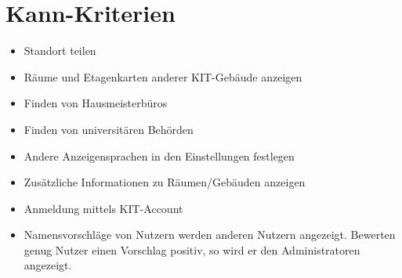 \section{Kann-Kriterien}

\begin{itemize}

    \item Standort teilen 
    \item Räume und Etagenkarten anderer KIT-Gebäude anzeigen
    \item Finden von Hausmeisterbüros
    \item Finden von universitären Behörden
    \item Andere Anzeigensprachen in den Einstellungen festlegen
    \item Zusätzliche Informationen zu Räumen/Gebäuden anzeigen
    \item Anmeldung mittels KIT-Account
    \item Namensvorschläge von Nutzern werden anderen Nutzern angezeigt. Bewerten genug Nutzer einen 
    Vorschlag positiv, so wird er den Administratoren angezeigt.
    
        

\end{itemize}